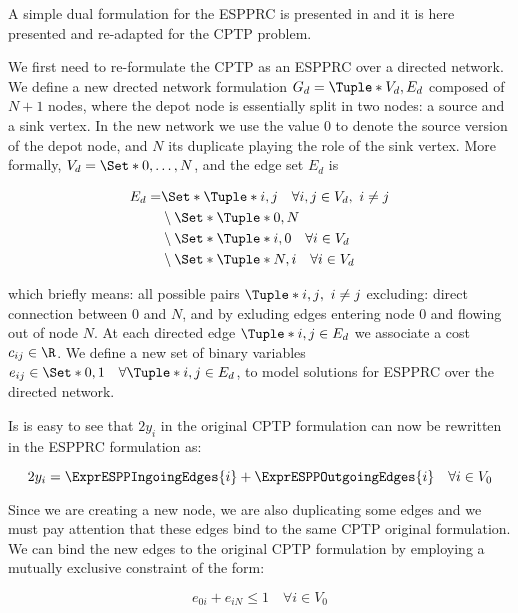 A simple dual formulation for the ESPPRC is presented in \cite{beasley1989algorithm} and it is here presented and re-adapted for the CPTP problem.

We first need to re-formulate the CPTP as an ESPPRC over a directed network.
We define a new drected network formulation $G_d = \Tuple*{V_d, E_d}$ composed of $N + 1$ nodes, where the depot node is essentially split in two nodes: a source and a sink vertex.
In the new network we use the value $0$ to denote the source version of the depot node, and $N$ its duplicate playing the role of the sink vertex.
More formally, $V_d = \Set*{ 0,\dots, N }$, and the edge set $E_d$ is

\begin{equation}
	\begin{aligned}
		E_d = & \Set*{\Tuple*{i, j} \quad \forall i, j \in V_d,\ i \ne j } \\
		      & \setminus \Set*{ \Tuple*{0, N} }                           \\
		      & \setminus \Set*{ \Tuple*{i, 0} \quad \forall i \in V_d }   \\
		      & \setminus \Set*{ \Tuple*{N, i} \quad \forall i \in V_d }   \\
	\end{aligned}
\end{equation}

which briefly means: all possible pairs $\Tuple*{i, j},\ i \ne j$ excluding: direct connection between $0$ and $N$, and by exluding edges entering node $0$ and flowing out of node $N$.
At each directed edge $\Tuple*{i, j} \in E_d$ we associate a cost $c_{ij} \in \R$.
We define a new set of binary variables $e_{ij} \in \Set*{0, 1} \quad \forall \Tuple*{i, j} \in E_d$, to model solutions for ESPPRC over the directed network.

Is is easy to see that $2 y_i$ in the original CPTP formulation can now be rewritten in the ESPPRC formulation as:

\begin{equation}
	2 y_i = \ExprESPPIngoingEdges{i} + \ExprESPPOutgoingEdges{i} \quad \forall i \in V_0
\end{equation}

Since we are creating a new node, we are also duplicating some edges and we must pay attention that these edges bind to the same CPTP original formulation.
We can bind the new edges to the original CPTP formulation by employing a mutually exclusive constraint of the form:

\begin{equation}
	e_{0i} + e_{iN} \le 1 \quad \forall i \in V_0
\end{equation}

